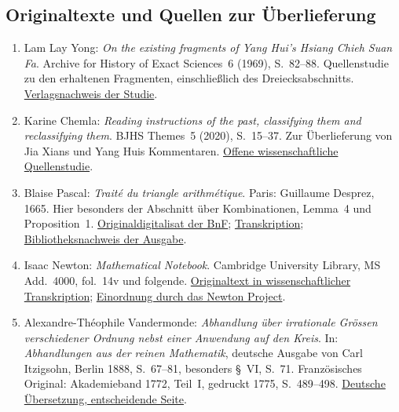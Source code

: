\subsection*{Originaltexte und Quellen zur Überlieferung}
\begingroup
\small
\begin{enumerate}
\item Lam Lay Yong: \emph{On the existing fragments of Yang Hui's
Hsiang Chieh Suan Fa}. Archive for History of Exact Sciences~6 (1969),
S.~82--88. Quellenstudie zu den erhaltenen Fragmenten, einschließlich
des Dreiecksabschnitts.
\href{https://doi.org/10.1007/BF00327264}{Verlagsnachweis der Studie}.

\item Karine Chemla: \emph{Reading instructions of the past,
classifying them and reclassifying them}. BJHS Themes~5 (2020),
S.~15--37. Zur Überlieferung von Jia Xians und Yang Huis Kommentaren.
\href{https://doi.org/10.1017/bjt.2020.2}{Offene wissenschaftliche Quellenstudie}.

\item Blaise Pascal: \emph{Traité du triangle arithmétique}.
Paris: Guillaume Desprez, 1665. Hier besonders der Abschnitt über
Kombinationen, Lemma~4 und Proposition~1.
\href{https://gallica.bnf.fr/ark:/12148/btv1b86262012}{Originaldigitalisat der BnF};
\href{https://fr.wikisource.org/wiki/Trait%C3%A9_du_triangle_arithm%C3%A9tique}{Transkription};
\href{https://ccfr.bnf.fr/portailccfr/ark:/16871/00114268519}{Bibliotheksnachweis der Ausgabe}.

\item Isaac Newton: \emph{Mathematical Notebook}.
Cambridge University Library, MS Add.~4000, fol.~14v und folgende.
\href{https://newtonproject.ox.ac.uk/view/texts/diplomatic/NATP00128}{Originaltext in wissenschaftlicher Transkription};
\href{https://newtonproject.ox.ac.uk/texts/introduction}{Einordnung durch das Newton Project}.
\item Alexandre-Théophile Vandermonde: \emph{Abhandlung über irrationale
Grössen verschiedener Ordnung nebst einer Anwendung auf den Kreis}.
In: \emph{Abhandlungen aus der reinen Mathematik}, deutsche Ausgabe von
Carl Itzigsohn, Berlin 1888, S.~67--81, besonders §~VI, S.~71.
Französisches Original: Akademieband 1772, Teil~I, gedruckt 1775,
S.~489--498.
\href{https://www.e-rara.ch/download/pdf/30678740.pdf\#page=6}{Deutsche Übersetzung, entscheidende Seite}.
\end{enumerate}
\endgroup
